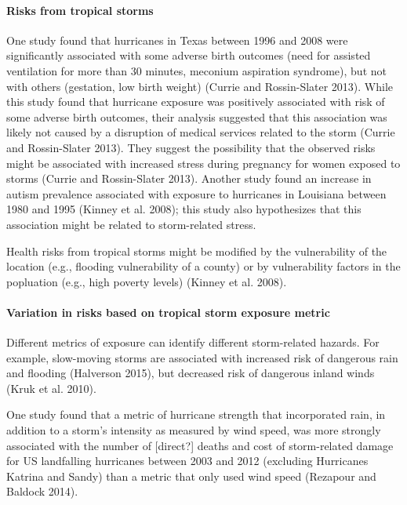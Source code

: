 \documentclass[]{elsarticle} %
\begin{document}
\paragraph{Risks from tropical storms}\label{risks-from-tropical-storms}

One study found that hurricanes in Texas between 1996 and 2008 were
significantly associated with some adverse birth outcomes (need for
assisted ventilation for more than 30 minutes, meconium aspiration
syndrome), but not with others (gestation, low birth weight) (Currie and
Rossin-Slater 2013). While this study found that hurricane exposure was
positively associated with risk of some adverse birth outcomes, their
analysis suggested that this association was likely not caused by a
disruption of medical services related to the storm (Currie and
Rossin-Slater 2013). They suggest the possibility that the observed
risks might be associated with increased stress during pregnancy for
women exposed to storms (Currie and Rossin-Slater 2013). Another study
found an increase in autism prevalence associated with exposure to
hurricanes in Louisiana between 1980 and 1995 (Kinney et al. 2008); this
study also hypothesizes that this association might be related to
storm-related stress.

Health risks from tropical storms might be modified by the vulnerability
of the location (e.g., flooding vulnerability of a county) or by
vulnerability factors in the popluation (e.g., high poverty levels)
(Kinney et al. 2008).

\paragraph{Variation in risks based on tropical storm exposure
metric}\label{variation-in-risks-based-on-tropical-storm-exposure-metric}

Different metrics of exposure can identify different storm-related
hazards. For example, slow-moving storms are associated with increased
risk of dangerous rain and flooding (Halverson 2015), but decreased risk
of dangerous inland winds (Kruk et al. 2010).

One study found that a metric of hurricane strength that incorporated
rain, in addition to a storm's intensity as measured by wind speed, was
more strongly associated with the number of {[}direct?{]} deaths and
cost of storm-related damage for US landfalling hurricanes between 2003
and 2012 (excluding Hurricanes Katrina and Sandy) than a metric that
only used wind speed (Rezapour and Baldock 2014).
\end{document}
